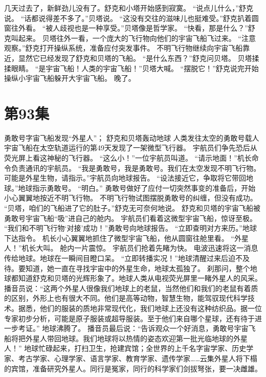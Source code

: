 \documentclass[a4paper,12pt,UTF8,twoside]{ctexbook}
\begin{document}
        几天过去了，新鲜劲儿没有了。舒克和小塔开始感到寂寞。 
        “说点儿什么，”舒克说。 
        “话都说得差不多了。”贝塔说。 
        “这没有交往的滋味儿也挺难受。”舒克扒着圆窗往外看。 
        “被人歧视也是一种享受。”贝塔像是哲学家。 
        “快看，那是什么？”舒克叫起来。 
        贝塔往外一看，一个庞大的飞行物向他们的宇宙飞船飞过来。 
        “注意观察。”舒克打开操纵系统，准备应付突发事件。 
        不明飞行物继续向宇宙飞船靠近，显然它已经发现了舒克和贝塔的飞船。 
        “是什么东西？”舒克问贝塔。 
        贝塔揉揉眼睛。 
        “是宇宙飞船！人类的宇宙飞船！”贝塔大喊。 
        “摆脱它！”舒克说完开始操纵小宇宙飞船躲开大宇宙飞船。 
        晚了。   \chapter{第93集} 
        勇敢号字宙飞船发现“外星人”； 
        舒克和贝塔轰动地球   
        人类发往太空的勇敢号载人宇宙飞船在太空轨道运行的第49天发现了一架微型飞行器。 
        宇航员们争先恐后从荧光屏上看这神秘的飞行器。 
        “这么小！”一位宇航员叫道。 
        “请示地面！”机长命令负责通讯的宇航员。 
        “我是勇敢号，我是勇敢号。我们在太空发现不明飞行物。可能是外星生物，请指示。”宇航员向地球报告。 
        “设法接近它，争取将它带回地球。”地球指示勇敢号。 
        “明白。” 
        勇敢号做好了应付一切突然事变的准备后，开始小心翼翼地按近不明飞行物。 
        不明飞行物试图摆脱勇敢号的纠缠，但没有成功。 
        “贝塔，咱们的飞船进了它的肚子。”舒克无可奈何地说。 
        舒克和贝塔的宇宙飞船被勇敢号宇宙飞船“吸”进自己的舱内。 
        宇航员们看着这微型宇宙飞船，惊讶至极。 
        “我们和不明飞行物‘对接’成功！”勇敢号向地球报告。 
        “立即查明对方来历。”地球下达指令。 
        机长小心翼翼地抓住了微型宇宙飞船，他从圆窗往舱里看。 
        “外星人！”机长大叫。 
        舱内一片震惊。 
        宇航员们抢着先睹为快。 
        电波迅速将这一消息传给地球。地球在一瞬间目瞪口呆。 
        “立即转播实况！”地球清醒过来后迫不及待。要知道，她一直在寻找宇宙中的外星生命，地球太孤独了。 
        刹那问，整个地球都知道舒克和贝塔的光辉形象了。地球人类从电视荧光屏里一睹外星人的风采。 
        播音员说：“这两个外星人很像我们地球上的老鼠，当然他们和我们的老鼠有着质的区别，外形上也有很大不同。他们是高等动物，智慧生物，能驾驭现代科学技术。据悉，他们的服装的质地非常现代化，我们地球上还没有这种纺织品。据一位专家初步分析，可能是原子服装或超导服装。至于他们来自哪个星球，还有待于进一步考证。” 
        地球沸腾了。 
        播音员最后说：“告诉观众一个好消息，勇敢号宇宙飞船将把外星人带回地球。我们地球将以热情的姿态欢迎第一批光临地球的外星人！” 
        地球忙碌起来，打扫卫生，抢建宾馆；全世界的上千名字宙学家、历史学家、考古学家、心理学家、语言学家、教育学家、遗传学家……云集外星人将下榻的宾馆，准备研究外星人。同行是冤家，同行的科学家们剑拔弩张，要一决雌雄。 
\end{document}
